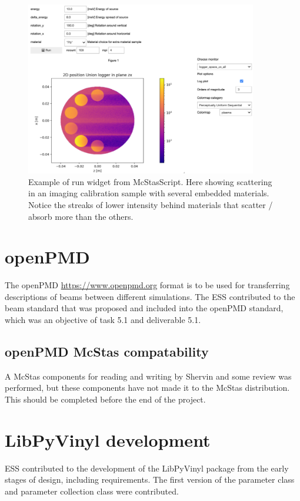 \documentclass[11pt, a4paper]{article}
\begin{document}
\begin{figure}
\centering
\includegraphics[width=0.9\textwidth]{figures/widget.png}
\caption{\label{fig:widget}Example of run widget from McStasScript. Here showing scattering in an imaging calibration sample with several embedded materials. Notice the streaks of lower intensity behind materials that scatter / absorb more than the others.}
\end{figure}

\clearpage
\section{openPMD}
The openPMD \href{https://www.openpmd.org}{https://www.openpmd.org} format is to be used for transferring descriptions of beams between different simulations. The ESS contributed to the beam standard that was proposed and included into the openPMD standard, which was an objective of task 5.1 and deliverable 5.1.

\subsection{openPMD McStas compatability}
A McStas components for reading and writing by Shervin and some review was performed, but these components have not made it to the McStas distribution. This should be completed before the end of the project.

\section{LibPyVinyl development}
ESS contributed to the development of the LibPyVinyl package from the early stages of design, including requirements. The first version of the parameter class and parameter collection class were contributed.
\end{document}
